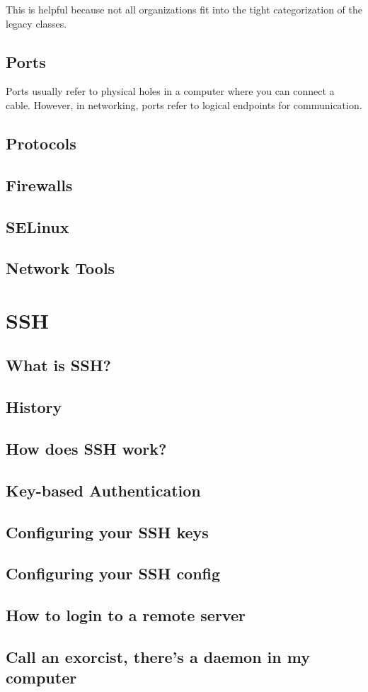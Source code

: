 This is helpful because not all organizations fit
into the tight categorization of the legacy classes.

\subsection{Ports}

Ports usually refer to physical holes in a computer
where you can connect a cable. However, in networking,
ports refer to logical endpoints for communication.



\vfill
\pagebreak
\subsection{Protocols}
\vfill
\pagebreak
\subsection{Firewalls}
\vfill
\pagebreak
\subsection{SELinux}
\vfill
\pagebreak
\subsection{Network Tools}


\vfill
\pagebreak
\section{SSH}
\subsection{What is SSH?}
\vfill
\pagebreak
\subsection{History}
\vfill
\pagebreak
\subsection{How does SSH work?}
\vfill
\pagebreak
\subsection{Key-based Authentication}
\vfill
\pagebreak
\subsection{Configuring your SSH keys}
\vfill
\pagebreak
\subsection{Configuring your SSH config}
\vfill
\pagebreak
\subsection{How to login to a remote server}
\vfill
\pagebreak
\subsection{Call an exorcist, there's a daemon in my computer}
